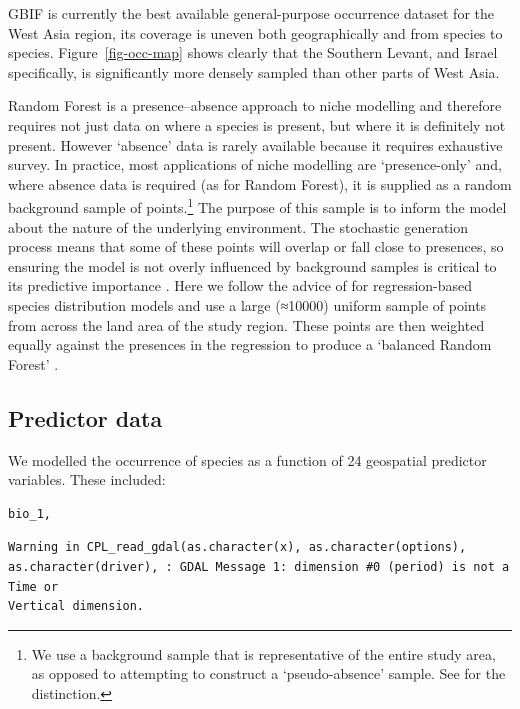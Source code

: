 \documentclass[
  authoryear,
  preprint]{elsarticle}
\begin{document}
GBIF is currently the best available general-purpose occurrence dataset
for the West Asia region, its coverage is uneven both geographically and
from species to species. Figure~\ref{fig-occ-map} shows clearly that the
Southern Levant, and Israel specifically, is significantly more densely
sampled than other parts of West Asia.

Random Forest is a presence--absence approach to niche modelling and
therefore requires not just data on where a species is present, but
where it is definitely not present. However `absence' data is rarely
available because it requires exhaustive survey. In practice, most
applications of niche modelling are `presence-only' and, where absence
data is required (as for Random Forest), it is supplied as a random
background sample of points.\footnote{We use a background sample that is
  representative of the entire study area, as opposed to attempting to
  construct a `pseudo-absence' sample. See \citet{SilleroEtAl2021} for
  the distinction.} The purpose of this sample is to inform the model
about the nature of the underlying environment. The stochastic
generation process means that some of these points will overlap or fall
close to presences, so ensuring the model is not overly influenced by
background samples is critical to its predictive importance
\citep{ValaviEtAl2022}. Here we follow the advice of
\citet{BarbetMassinEtAl2012} for regression-based species distribution
models and use a large (≈10000) uniform sample of points from across the
land area of the study region. These points are then weighted equally
against the presences in the regression to produce a `balanced Random
Forest' \citep{ValaviEtAl2022}.

\subsection{Predictor data}\label{sec-predictors}

We modelled the occurrence of species as a function of 24 geospatial
predictor variables. These included:

\begin{verbatim}
bio_1, 
\end{verbatim}

\begin{verbatim}
Warning in CPL_read_gdal(as.character(x), as.character(options),
as.character(driver), : GDAL Message 1: dimension #0 (period) is not a Time or
Vertical dimension.
\end{verbatim}
\end{document}
